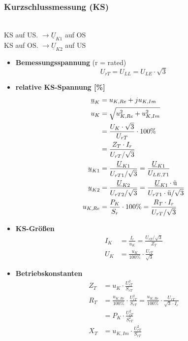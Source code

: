\subsubsection{Kurzschlussmessung (KS)}\,\\
\setlength\parindent{20pt}\indent KS auf US. $\rightarrow  \underline{U}_{K1}$ auf OS\\
\indent KS auf OS. $\rightarrow \underline{U}_{K2}$ auf US
\begin{itemize}
    \item[]{\textbf{Bemessungsspannung} (r = rated)}
    \[
    U_{rT} = U_{LL} = U_{LE} \cdot \sqrt{3}
    \]

    \item[]{\textbf{relative KS-Spannung [\%]}}
    \begin{align*}
    \underline{u}_K &= u_{K,Re} + j u_{K,Im}\\
        u_K  &= \sqrt{u^2_{K,Re}+u^2_{K,Im}}\\
             &= \frac{U_K\cdot \sqrt{3}}{U_{rT}}\cdot 100\%\\
             &= \frac{Z_T \cdot I_r}{U_{rT}/\sqrt{3}}\\
    \underline{u}_{K1}  &= \frac{\underline{U}_{K1}}{ U_{rT1}/\sqrt{3} } =\frac{\underline{U}_{K1}}{U_{LE,T1}}\\
    \underline{u}_{K2} &= \frac{\underline{U}_{K2}}{ U_{rT2}/\sqrt{3}} = \frac{\underline{U}_{K1} \cdot \textnormal{ü}}{ U_{rT1} \cdot \textnormal{ü}/\sqrt{3}}\\
    u_{K,Re}      &= \frac{P_{K}}{S_{r}}\cdot 100\%=\frac{R_T \cdot I_r}{U_{rT}/\sqrt{3}}
    \end{align*}

    \item[]{\textbf{KS-Größen}}
    \begin{align*}
    I_K &= \frac{I_r}{u_K} = \frac{U_{rT}/\sqrt{3}}{Z_T}\\
    U_K &= \frac{u_K}{100\%} \cdot \frac{U_{rT}}{\sqrt{3}}
    \end{align*}

    \item[]{\textbf{Betriebskonstanten}}
    \begin{align*}
    Z_T &= u_K \cdot \frac{U^2_{rT}}{S_{rT}} \\
    R_T &= \frac{u_{K,Re}}{100\%} \cdot \frac{U^2_{rT}}{S_{rT}} =
         \frac{u_{K,Re}}{100\%} \cdot \frac{U_{rT}}{\sqrt{3}\cdot I_r}\\
        &= P_K \cdot \frac{U^2_{rT}}{S^2_{rT}}\\
    X_T &= u_{K,Im} \cdot \frac{U^2_{rT}}{S_{rT}}
    \end{align*}


\end{itemize}
